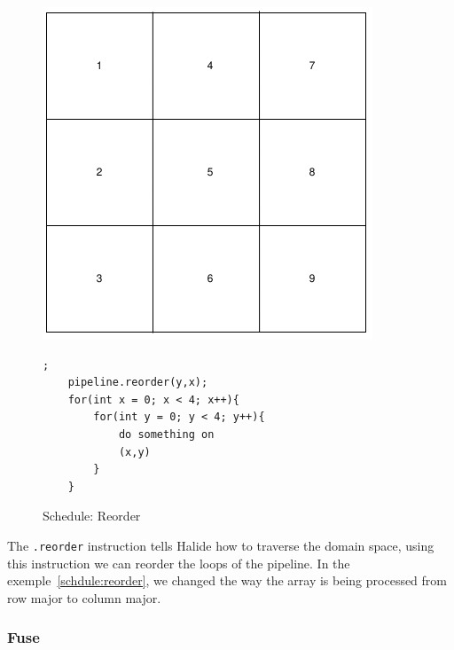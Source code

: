 \begin{figure}[H]

		\begin{minipage}[c]{\EIW}
			\centering
		\includegraphics[width=\textwidth]{Images/Reorder.png}
		\end{minipage}
		\begin{minipage}[c]{\ECW}
			\centering
\begin{lstlisting}[label={code:reorder}];
    pipeline.reorder(y,x);
	for(int x = 0; x < 4; x++){
		for(int y = 0; y < 4; y++){
			do something on
			(x,y)
		}
	}
\end{lstlisting}
		\end{minipage}
		\caption{Schedule: Reorder}
		\label{schedule:reorder}
\end{figure}



	The \verb|.reorder| instruction tells Halide how to traverse the domain space, using this instruction we can reorder the loops of the pipeline. In the exemple~\ref{schdule:reorder}, we changed the way the array is being processed from row major to column major.


	\subsubsection{Fuse}


